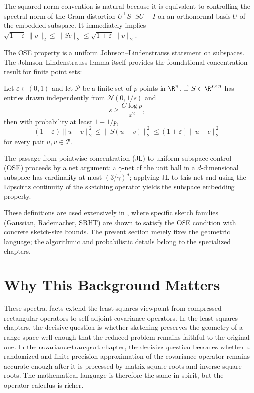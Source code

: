The squared-norm convention is natural because it is equivalent to controlling
the spectral norm of the Gram distortion \(U^\top S^\top S U - I\) on an
orthonormal basis \(U\) of the embedded subspace. It immediately implies
\(\sqrt{1-\varepsilon}\,\|v\|_2 \le \|Sv\|_2 \le \sqrt{1+\varepsilon}\,\|v\|_2\).

The OSE property is a uniform Johnson--Lindenstrauss statement on subspaces.
The Johnson--Lindenstrauss lemma itself provides the foundational concentration
result for finite point sets:

\begin{lemma}
	\label{lem:jl_background}
	Let \(\varepsilon \in (0,1)\) and let \(\mathcal{P}\) be a finite set of
	\(p\) points in \(\R^n\). If \(S \in \R^{s \times n}\) has entries drawn
	independently from \(\mathcal{N}(0,1/s)\) and
	\[
		s \ge \frac{C\log p}{\varepsilon^2},
	\]
	then with probability at least \(1 - 1/p\),
	\[
		(1-\varepsilon)\|u - v\|_2^2 \le \|S(u-v)\|_2^2 \le
		(1+\varepsilon)\|u - v\|_2^2
	\]
	for every pair \(u,v \in \mathcal{P}\).
\end{lemma}

The passage from pointwise concentration (JL) to uniform subspace control (OSE)
proceeds by a net argument: a \(\gamma\)-net of the unit ball in a
\(d\)-dimensional subspace has cardinality at most \((3/\gamma)^d\); applying JL
to this net and using the Lipschitz continuity of the sketching operator yields
the subspace embedding property.

These definitions are used extensively in , where specific
sketch families (Gaussian, Rademacher, SRHT) are shown to satisfy the OSE
condition with concrete sketch-size bounds. The present section merely fixes the
geometric language; the algorithmic and probabilistic details belong to the
specialized chapters.

\section{Why This Background Matters}

These spectral facts extend the least-squares viewpoint from compressed
rectangular operators to self-adjoint covariance operators. In the least-squares
chapters, the decisive question is whether sketching preserves the geometry of a
range space well enough that the reduced problem remains faithful to the original
one. In the covariance-transport chapter, the decisive question becomes whether a
randomized and finite-precision approximation of the covariance operator remains
accurate enough after it is processed by matrix square roots and inverse square
roots. The mathematical language is therefore the same in spirit, but the operator
calculus is richer.


